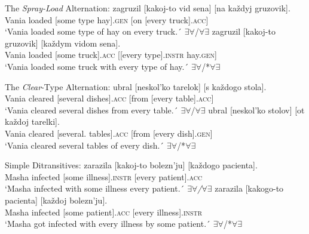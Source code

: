 \documentclass[output=paper,colorlinks,citecolor=brown,nonflat]{./langscibook}
\begin{document}
\ea%
    \label{ex:antonyuk:4}
    The \textit{Spray-Load} Alternation:
    \ea \label{ex:antonyuk:4a}
     {zagruzil} {[kakoj-to}    {vid}   {sena]}       {[na}  {každyj} {gruzovik]}.\\
    Vania loaded   [some   type hay].\textsc{gen} [on [every  truck].\textsc{acc}]\\
    \glt `Vania loaded some type of hay on every truck.´ \hfill ${\exists}{\forall}$/${\forall}{\exists}$
    \ex \label{ex:antonyuk:4b}
     {zagruzil} {[kakoj-to} {gruzovik]}    {[každym} {vidom}          {sena]}.\\
    Vania loaded  [some       truck].\textsc{acc} [[every    type].\textsc{instr}  hay.\textsc{gen}]\\
    \glt `Vania loaded some truck with every type of hay.´ \hfill ${\exists}{\forall}$/*${\forall}{\exists}$
    \z
\z



\ea%
    \label{ex:antonyuk:5}
    The \textit{Clear}-Type Alternation: 
    \ea \label{ex:antonyuk:5a}
     {ubral}    {[neskol’ko}  {tarelok]}      {[s}        {každogo} {stola]}.\\
    Vania cleared [several      dishes].\textsc{acc} [from [every      table].\textsc{acc]}\\
    \glt `Vania cleared several dishes from every table.´ \hfill ${\exists}{\forall}$/${\forall}{\exists}$
    \ex \label{ex:antonyuk:5b}
     {ubral}   {[neskol’ko} {stolov]}      {[ot}    {každoj} {tarelki]}.\\
    Vania cleared [several.     tables].\textsc{acc}  [from  [every  dish].\textsc{gen}]\\
    \glt `Vania cleared several tables of every dish.´ \hfill ${\exists}{\forall}$/*${\forall}{\exists}$
    \z
\z


\ea%
    \label{ex:antonyuk:6}
    Simple Ditransitives:
    \ea \label{ex:antonyuk:6a}
       {zarazila} {[kakoj-to} {bolezn’ju]}  {[každogo} {pacienta]}.\\
    Masha infected [some      illness].\textsc{instr}   [every     patient].\textsc{acc}\\
    \glt `Masha infected with some illness every patient.´ \hfill \textit{${\exists}{\forall}$/${\forall}{\exists}$}
    \ex \label{ex:antonyuk:6b}
       {zarazila} {[kakogo-to} {pacienta]}   {[každoj} {bolezn’ju]}.\\
    Masha infected [some         patient].\textsc{acc}   [every  illness].\textsc{instr}\\
    \glt `Masha got infected with every illness by some patient.´ \hfill ${\exists}{\forall}$/*${\forall}{\exists}$
    \z
\z
\end{document}
